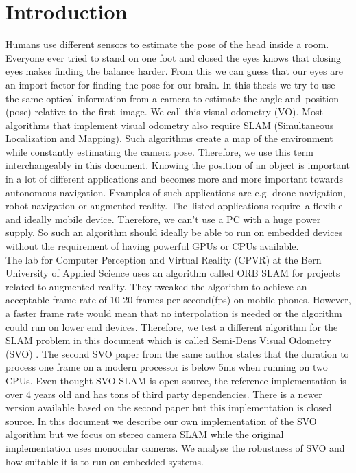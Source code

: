\documentclass[11pt,a4paper,titlepage,oneside]{report}
\begin{document}
\tableofcontents

\chapter{Introduction}

Humans use different sensors to estimate the pose of the head inside a room. Everyone ever tried to stand on one foot and closed the eyes knows that closing eyes makes finding the balance harder. From this we can guess that our eyes are an import factor for finding the pose for our brain. In this thesis we try to use the same optical information from a camera to estimate the angle and position (pose) relative to the first image. We call this visual odometry (VO). Most algorithms that implement visual odometry also require SLAM (Simultaneous Localization and Mapping). Such algorithms create a map of the environment while constantly estimating the camera pose. Therefore, we use this term interchangeably in this document. Knowing the position of an object is important in a lot of different applications and becomes more and more important towards autonomous navigation. Examples of such applications are e.g. drone navigation, robot navigation or augmented reality. The listed applications require a flexible and ideally mobile device. Therefore, we can’t use a PC with a huge power supply. So such an algorithm should ideally be able to run on embedded devices without the requirement of having powerful GPUs or CPUs available.\\
The lab for Computer Perception and Virtual Reality (CPVR) at the Bern University of Applied Science uses an algorithm called ORB SLAM \cite{orbslam} for projects related to augmented reality. They tweaked the algorithm to achieve an acceptable frame rate of 10-20 frames per second(fps) on mobile phones. However, a faster frame rate would mean that no interpolation is needed or the algorithm could run on lower end devices. Therefore, we test a different algorithm for the SLAM problem in this document which is called Semi-Dens Visual Odometry (SVO) \cite{svo}. The second SVO paper \cite{svo2} from the same author states that the duration to process one frame on a modern processor is below 5ms when running on two CPUs. Even thought SVO SLAM is open source, the reference implementation is over 4 years old and has tons of third party dependencies. There is a newer version available based on the second paper but this implementation is closed source. In this document we describe our own implementation of the SVO algorithm but we focus on stereo camera SLAM while the original implementation uses monocular cameras. We analyse the robustness of SVO and how suitable it is to run on embedded systems.
\end{document}
